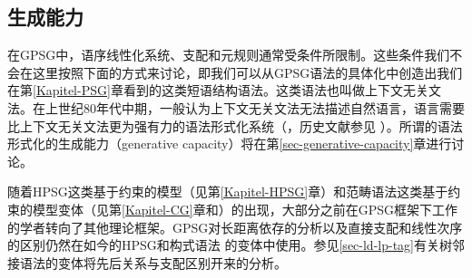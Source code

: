 \subsection{生成能力}

在GPSG中，语序线性化系统、支配和元规则通常受条件所限制。这些条件我们不会在这里按照下面的方式来讨论，即我们可以从GPSG语法的具体化中创造出我们在第\ref{Kapitel-PSG}章看到的这类短语结构语法。这类语法也叫做上下文无关文法。在上世纪80年代中期，一般认为上下文无关文法无法描述自然语言，语言需要比上下文无关文法更为强有力的语法形式化系统（\citealp{Shieber85a,Culy85a}，历史文献参见 ）。所谓的语法形式化的生成能力（generative capacity）将在第\ref{sec-generative-capacity}章进行讨论。

随着HPSG这类基于约束的模型（见第\ref{Kapitel-HPSG}章）和范畴语法这类基于约束的模型变体（见第\ref{Kapitel-CG}章和\citealp{Uszkoreit86d}）的出现，大部分之前在GPSG框架下工作的学者转向了其他理论框架。GPSG对长距离依存的分析以及直接支配和线性次序的区别仍然在如今的HPSG\indexhpsg 和构式语法\indexcxg
的变体中使用。参见\ref{sec-ld-lp-tag}有关树邻接语法的变体将先后关系与支配区别开来的分析。

